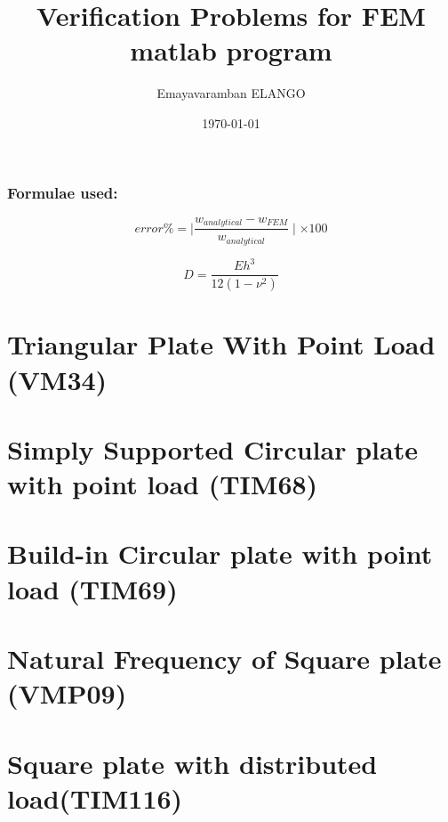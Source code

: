 \documentclass[a4paper]{article}
\begin{document}
\title{Verification Problems for FEM matlab program}
\author{Emayavaramban ELANGO}
\date{\today}
\maketitle
\tableofcontents

\vspace{5cm}
\subsubsection*{Formulae used: }

\begin{equation}
error \% = \mid \frac{w_{analytical}-w_{FEM}}{w_{analytical}} \mid \times 100
\end{equation}

\begin{equation}
D = \frac{Eh^3}{12(1-\nu^2)}
\end{equation} 
\newpage

\section{Triangular Plate With Point Load (VM34)}

%



\section{Simply Supported Circular plate with point load (TIM68)}

%


\section{Build-in Circular plate with point load (TIM69)}

%



\section{Natural Frequency of Square plate (VMP09)}

%




\section{Square plate with distributed load(TIM116)}
\end{document}
